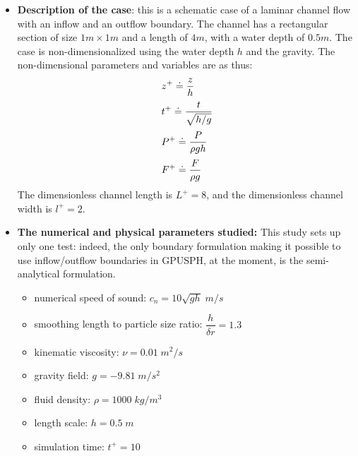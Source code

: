 \documentclass{../GPUSPHtemplate}
\begin{document}
\begin{itemize}
\item \textbf{Description of the case}: this is a schematic case of a laminar channel flow with an inflow and an outflow boundary.
  The channel has a rectangular section of size $1m \times 1m$ and a length of $4m$, with a water depth of $0.5m$.
  The case is non-dimensionalized using the water depth $h$ and the gravity. The non-dimensional parameters and variables are as thus:   
  \begin{equation}
    \begin{array}{l}
      \displaystyle{  z^{+} \doteq \frac{z}{h} } \medskip \\ 
      \displaystyle{  t^{+} \doteq \frac{t}{\sqrt{h/g}} } \medskip \\ 
      \displaystyle{  P^{+} \doteq \frac{P}{\rho gh} } \medskip \\ 
      \displaystyle{  F^{+} \doteq \frac{F}{\rho g} } 
    \end{array}
  \end{equation}
  The dimensionless channel length is $L^+=8$, and the dimensionless channel width is $l^+=2$.

\item \textbf{The numerical and physical parameters studied:} This study sets up only one test: indeed, the only
  boundary formulation making it possible to use inflow/outflow boundaries in GPUSPH, at the moment, is the semi-analytical
  formulation.
  \begin{itemize}
  \item numerical speed of sound: ${c_n} = 10\sqrt{gh} \; m/s$
  \item smoothing length to particle size ratio: $\dfrac{h}{\delta r}=1.3$ 
  \item kinematic viscosity: $\nu = 0.01 \; {m^2}/{s}$
  \item gravity field: $g = -9.81 \; {m}/{s^2}$
  \item fluid density: $\rho = 1000 \; {kg}/{m^3} $
  \item length scale: $h = 0.5 \; m$
  \item simulation time: $t^+ = 10 $ 
  \end{itemize}
\end{itemize}
\end{document}
